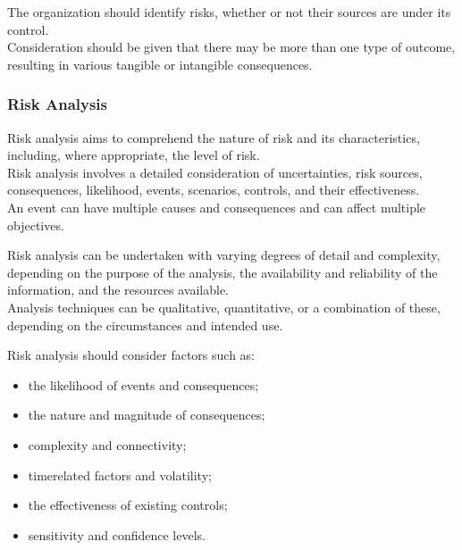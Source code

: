 \documentclass[letterpaper,10pt,english]{jupyterBook}
\begin{document}
\sphinxAtStartPar
The organization should identify risks, whether or not their sources are under its control. \\
Consideration should be given that there may be more than one type of outcome, resulting in various tangible or intangible consequences.


\subsubsection{Risk Analysis}
\label{\detokenize{PM/rm:risk-analysis}}
\sphinxAtStartPar
Risk analysis aims to comprehend the nature of risk and its characteristics, including, where appropriate, the level of risk. \\
Risk analysis involves a detailed consideration of uncertainties, risk sources, consequences, likelihood, events, scenarios, controls, and their effectiveness. \\
An event can have multiple causes and consequences and can affect multiple objectives.

\sphinxAtStartPar
Risk analysis can be undertaken with varying degrees of detail and complexity, depending on the purpose of the analysis, the availability and reliability of the information, and the resources available. \\
Analysis techniques can be qualitative, quantitative, or a combination of these, depending on the circumstances and intended use.

\sphinxAtStartPar
Risk analysis should consider factors such as:
\begin{itemize}
\item {} 
\sphinxAtStartPar
the likelihood of events and consequences;

\item {} 
\sphinxAtStartPar
the nature and magnitude of consequences;

\item {} 
\sphinxAtStartPar
complexity and connectivity;

\item {} 
\sphinxAtStartPar
time\sphinxhyphen{}related factors and volatility;

\item {} 
\sphinxAtStartPar
the effectiveness of existing controls;

\item {} 
\sphinxAtStartPar
sensitivity and confidence levels.

\end{itemize}
\end{document}
